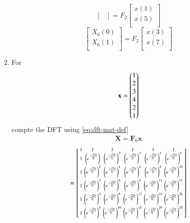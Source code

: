 \documentclass[journal,12pt,twocolumn]{IEEEtran}
\let\vec\mathbf
\renewcommand\thesection{\arabic{section}}
\begin{document}
\begin{enumerate}[label=\arabic*.,ref=\thesection.\theenumi]
\begin{equation}
\begin{bmatrix}
	\end{bmatrix}
	= F_{2}
	\begin{bmatrix}
		x(1) \\ 
		x(5) \\ 
	\end{bmatrix}
\end{equation}
\begin{equation}
	\begin{bmatrix}
		X_{6}(0) \\ 
		X_{6}(1)\\ 
	\end{bmatrix}
	= F_{2}
	\begin{bmatrix}
		x(3) \\ 
		x(7) \\ 
	\end{bmatrix}
\end{equation}
\item For 
\begin{align}
	\vec{x} = \myvec{1\\2\\3\\4\\2\\1}
	\label{eq:equation1}
\end{align}
compte the DFT  
using 
\eqref{eq:dft-mat-def}\\
\solution
\begin{align}
	\vec{X} = \vec{F}_6 \vec{x}
\end{align}	
\begin{align}
	= \begin{bsmallmatrix}
		1	&	1	&	1	&	1	&	1	&	1\\
		1	&	\brak{e^{\frac{-j2\pi}{6}}}	&	\brak{e^{\frac{-j2\pi}{6}}}^2	&	\brak{e^{\frac{-j2\pi}{6}}}^3	&	\brak{e^{\frac{-j2\pi}{6}}}^4	&	\brak{e^{\frac{-j2\pi}{6}}}^5\\
		1	&	\brak{e^{\frac{-j2\pi}{6}}}^2	&	\brak{e^{\frac{-j2\pi}{6}}}^4	&	\brak{e^{\frac{-j2\pi}{6}}}^6	&	\brak{e^{\frac{-j2\pi}{6}}}^8	&	\brak{e^{\frac{-j2\pi}{6}}}^{10}\\
		1	&	\brak{e^{\frac{-j2\pi}{6}}}^3	&	\brak{e^{\frac{-j2\pi}{6}}}^6	&	\brak{e^{\frac{-j2\pi}{6}}}^9	&	\brak{e^{\frac{-j2\pi}{6}}}^{12}	&	\brak{e^{\frac{-j2\pi}{6}}}^{15}\\
		1	&	\brak{e^{\frac{-j2\pi}{6}}}^4	&	\brak{e^{\frac{-j2\pi}{6}}}^8	&	\brak{e^{\frac{-j2\pi}{6}}}^{12}	&	\brak{e^{\frac{-j2\pi}{6}}}^{16}	&	\brak{e^{\frac{-j2\pi}{6}}}^{20}\\
		1	&	\brak{e^{\frac{-j2\pi}{6}}}^5	&	\brak{e^{\frac{-j2\pi}{6}}}^{10}	&	\brak{e^{\frac{-j2\pi}{6}}}^{15}	&	\brak{e^{\frac{-j2\pi}{6}}}^{20}	&	\brak{e^{\frac{-j2\pi}{6}}}^{25}

\end{bsmallmatrix}
\end{align}
\end{enumerate}
\end{document}

